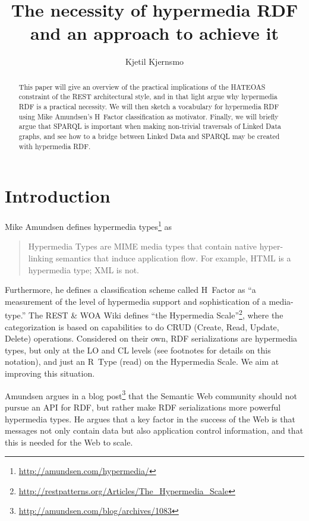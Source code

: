 \documentclass{llncs}
\title{The necessity of hypermedia RDF and an approach to achieve it}
\author{Kjetil Kjernsmo\inst{1}}
\institute{Department of Informatics,
Postboks 1080 Blindern,
0316 Oslo, Norway
\email{kjekje@ifi.uio.no}}
\begin{document}
\maketitle



\begin{abstract}
This paper will give an overview of the practical implications of the
HATEOAS constraint of the REST architectural style, and in that light argue why
hypermedia RDF is a practical necessity. We will then sketch a
vocabulary for hypermedia RDF using Mike Amundsen's H~Factor
classification as motivator. Finally, we will briefly argue that
SPARQL is important when making non-trivial traversals of Linked Data
graphs, and see how to a bridge between Linked Data and SPARQL may be
created with hypermedia RDF.
\end{abstract}

\section{Introduction}

Mike Amundsen defines hypermedia types\footnote{\url{http://amundsen.com/hypermedia/}} as 
\begin{quote}
Hypermedia Types are MIME media types that contain native
hyper-linking semantics that induce application flow. For example,
HTML is a hypermedia type; XML is not.
\end{quote}
Furthermore, he defines a classification scheme called H~Factor as ``a
measurement of the level of hypermedia support and sophistication of a
media-type.'' The REST \& WOA Wiki defines ``the Hypermedia
Scale''\footnote{\url{http://restpatterns.org/Articles/The\_Hypermedia\_Scale}},
where the categorization is based on capabilities to do CRUD (Create,
Read, Update, Delete) operations.  Considered on their own, RDF
serializations are hypermedia types, but only at the \textsf{LO} and
\textsf{CL} levels (see footnotes for details on this notation), and just an R~Type
(read) on the Hypermedia Scale. We aim at improving this situation.

Amundsen argues in a blog
post\footnote{\url{http://amundsen.com/blog/archives/1083}} that the
Semantic Web community should not pursue an API for RDF, but rather
make RDF serializations more powerful hypermedia types. He argues that
a key factor in the success of the Web is that messages not only
contain data but also application control information, and that this is
needed for the Web to scale.
\end{document}
